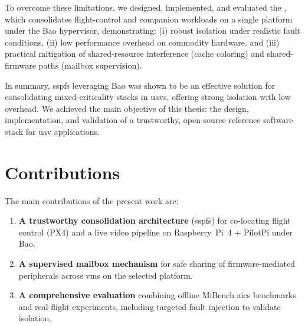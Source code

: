 To overcome these limitations, we designed, implemented, and evaluated the
, which consolidates flight-control and companion workloads on
a single platform under the Bao hypervisor, demonstrating:
(i) robust isolation under realistic fault conditions,
(ii) low performance overhead on commodity hardware, and
(iii) practical mitigation of shared-resource interference (cache coloring) and
shared-firmware paths (mailbox supervision).

In summary, \gls{sspfs} leveraging Bao was shown to be an effective solution for
consolidating mixed-criticality stacks in \glspl{uav}, offering strong isolation
with low overhead. We achieved the main objective of this thesis: the design,
implementation, and validation of a trustworthy, open-source reference software
stack for \gls{uav} applications.

\section{Contributions}
The main contributions of the present work are:
\begin{enumerate}
  \item \textbf{A trustworthy consolidation architecture} (\gls{sspfs}) for co-locating flight control (PX4) and a live video pipeline on Raspberry~Pi~4 + PilotPi under Bao.
  \item \textbf{A supervised mailbox mechanism} for safe sharing of
    firmware-mediated peripherals across \glspl{vm} on the selected platform.
  \item \textbf{A comprehensive evaluation} combining offline MiBench \gls{aics} benchmarks and real-flight experiments, including targeted fault injection to validate isolation.
\end{enumerate}



